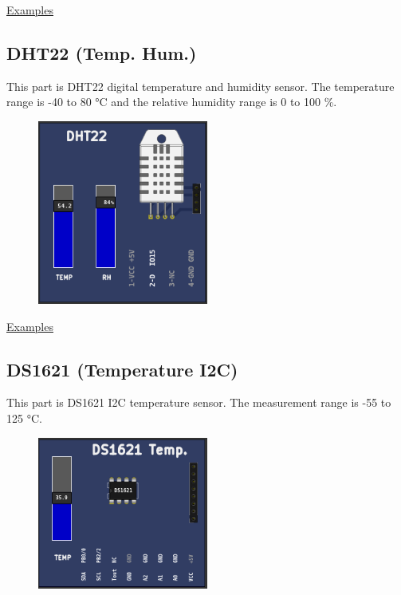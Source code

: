 \href{https://lcgamboa.github.io/picsimlab_examples/parts_DHT11_(Temp._Hum.).html}{Examples}

\subsection{DHT22 (Temp. Hum.)} 

This part is DHT22 digital temperature and humidity sensor. The temperature  range is -40 to 80 °C  
and the relative humidity range is 0 to 100 \%.

\begin{figure}[H]
\center
\includegraphics[width=0.5\textwidth]{img/part_dht22.png} 
\end{figure} 


\href{https://lcgamboa.github.io/picsimlab_examples/parts_DHT22_(Temp._Hum.).html}{Examples}

  
\subsection{DS1621 (Temperature I2C)}


This part is DS1621 I2C temperature sensor. The measurement range is -55 to 125 °C.

\begin{figure}[H]
\center
\includegraphics[width=0.5\textwidth]{img/part_ds1621.png} 
\end{figure} 


